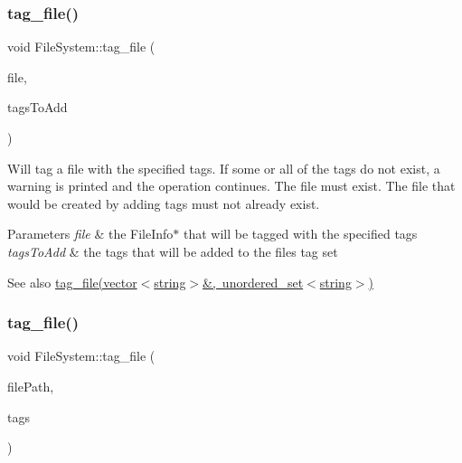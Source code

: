 \subsubsection{\texorpdfstring{tag\+\_\+file()}{tag\_file()}\hspace{0.1cm}{\footnotesize\ttfamily [1/2]}}
{\footnotesize\ttfamily void File\+System\+::tag\+\_\+file (\begin{DoxyParamCaption}\item[{\mbox{\hyperlink{classFileInfo}{File\+Info}} $\ast$}]{file,  }\item[{unordered\+\_\+set$<$ string $>$}]{tags\+To\+Add }\end{DoxyParamCaption})}

Will tag a file with the specified tags. If some or all of the tags do not exist, a warning is printed and the operation continues. The file must exist. The file that would be created by adding tags must not already exist. 
\begin{DoxyParams}{Parameters}
{\em file} & the File\+Info$\ast$ that will be tagged with the specified tags \\
\hline
{\em tags\+To\+Add} & the tags that will be added to the file\textquotesingle{}s tag set \\
\hline
\end{DoxyParams}
\begin{DoxySeeAlso}{See also}
\mbox{\hyperlink{classFileSystem_a7d761ee2fa4d0c2965b5d3c7a75e7fdc}{tag\+\_\+file(vector$<$string$>$\&, unordered\+\_\+set$<$string$>$)}} 
\end{DoxySeeAlso}
\mbox{\label{classFileSystem_a7d761ee2fa4d0c2965b5d3c7a75e7fdc}} 
\subsubsection{\texorpdfstring{tag\+\_\+file()}{tag\_file()}\hspace{0.1cm}{\footnotesize\ttfamily [2/2]}}
{\footnotesize\ttfamily void File\+System\+::tag\+\_\+file (\begin{DoxyParamCaption}\item[{vector$<$ string $>$ \&}]{file\+Path,  }\item[{unordered\+\_\+set$<$ string $>$}]{tags }\end{DoxyParamCaption})}

